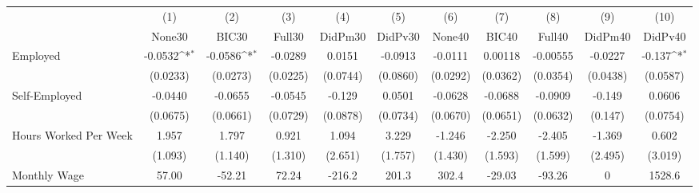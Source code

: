 {
\def\sym#1{\ifmmode^{#1}\else\(^{#1}\)\fi}
\begin{tabular}{l*{10}{c}}
\toprule
            &\multicolumn{1}{c}{(1)}&\multicolumn{1}{c}{(2)}&\multicolumn{1}{c}{(3)}&\multicolumn{1}{c}{(4)}&\multicolumn{1}{c}{(5)}&\multicolumn{1}{c}{(6)}&\multicolumn{1}{c}{(7)}&\multicolumn{1}{c}{(8)}&\multicolumn{1}{c}{(9)}&\multicolumn{1}{c}{(10)}\\
            &\multicolumn{1}{c}{None30}&\multicolumn{1}{c}{BIC30}&\multicolumn{1}{c}{Full30}&\multicolumn{1}{c}{DidPm30}&\multicolumn{1}{c}{DidPv30}&\multicolumn{1}{c}{None40}&\multicolumn{1}{c}{BIC40}&\multicolumn{1}{c}{Full40}&\multicolumn{1}{c}{DidPm40}&\multicolumn{1}{c}{DidPv40}\\
\midrule
Employed    &     -0.0532\sym{*}  &     -0.0586\sym{*}  &     -0.0289         &      0.0151         &     -0.0913         &     -0.0111         &     0.00118         &    -0.00555         &     -0.0227         &      -0.137\sym{*}  \\
            &    (0.0233)         &    (0.0273)         &    (0.0225)         &    (0.0744)         &    (0.0860)         &    (0.0292)         &    (0.0362)         &    (0.0354)         &    (0.0438)         &    (0.0587)         \\
\addlinespace
Self-Employed&     -0.0440         &     -0.0655         &     -0.0545         &      -0.129         &      0.0501         &     -0.0628         &     -0.0688         &     -0.0909         &      -0.149         &      0.0606         \\
            &    (0.0675)         &    (0.0661)         &    (0.0729)         &    (0.0878)         &    (0.0734)         &    (0.0670)         &    (0.0651)         &    (0.0632)         &     (0.147)         &    (0.0754)         \\
\addlinespace
Hours Worked Per Week&       1.957         &       1.797         &       0.921         &       1.094         &       3.229         &      -1.246         &      -2.250         &      -2.405         &      -1.369         &       0.602         \\
            &     (1.093)         &     (1.140)         &     (1.310)         &     (2.651)         &     (1.757)         &     (1.430)         &     (1.593)         &     (1.599)         &     (2.495)         &     (3.019)         \\
\addlinespace
Monthly Wage&       57.00         &      -52.21         &       72.24         &      -216.2         &       201.3         &       302.4         &      -29.03         &      -93.26         &           0         &      1528.6         \\

\end{tabular}}

